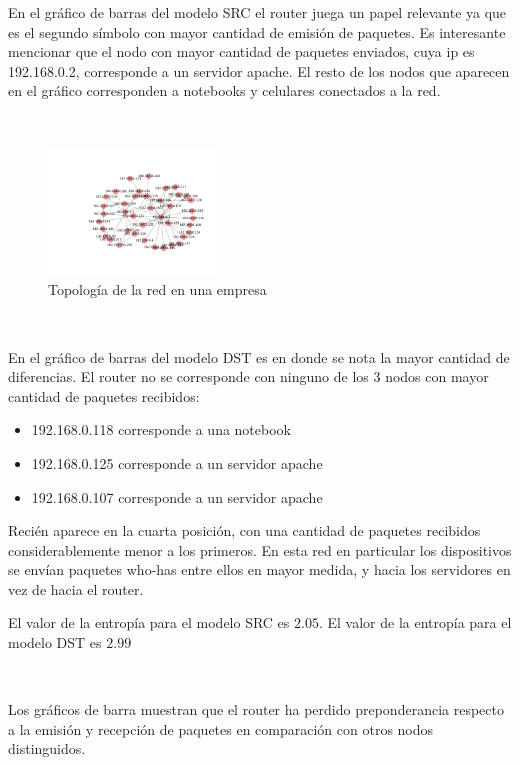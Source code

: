 En el gráfico de barras del modelo SRC el router juega un papel relevante ya que es el segundo
símbolo con mayor cantidad de emisión de paquetes. Es interesante mencionar que el 
nodo con mayor cantidad de paquetes enviados, cuya ip es 192.168.0.2, corresponde a un servidor apache.
El resto de los nodos que aparecen en el gráfico corresponden a notebooks
y celulares conectados a la red.

~

\begin{figure}
\vspace{-25pt}
\hspace{-35pt}
\centering
   \includegraphics[width=0.4\textwidth]{resultados/empresa/conectividadNX.pdf}
\vspace{-30pt}
   \caption{Topología de la red en una empresa}
\end{figure}

~

En el gráfico de barras del modelo DST es en donde se nota la mayor cantidad de diferencias. 
El router no se corresponde con ninguno de los 3 nodos con mayor cantidad de paquetes
recibidos:

\begin{itemize}
    \item 192.168.0.118 corresponde a una notebook
    \item 192.168.0.125 corresponde a un servidor apache
    \item 192.168.0.107 corresponde a un servidor apache
\end{itemize}

Recién aparece en la cuarta posición, con una cantidad de paquetes recibidos considerablemente
menor a los primeros. En esta red en particular los dispositivos se envían paquetes
who-has entre ellos en mayor medida, y hacia los servidores en vez de hacia el router.

El valor de la entropía para el modelo SRC es $2.05$. El valor de la entropía para 
el modelo DST es $2.99$


~

Los gráficos de barra muestran que el router ha perdido preponderancia respecto a la emisión
y recepción de paquetes en comparación con otros nodos distinguidos.

